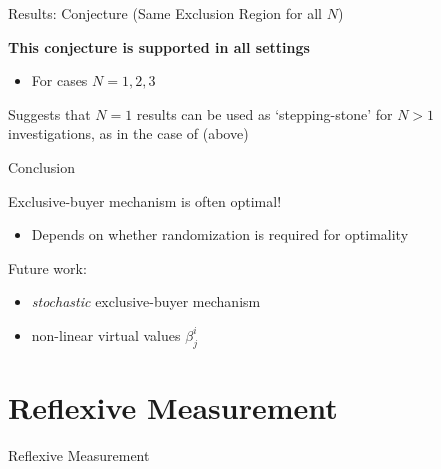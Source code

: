\documentclass[aspectratio=169,xcolor=dvipsnames]{beamer}
\begin{document}

\begin{frame}{Results: Conjecture (Same Exclusion Region for all $N$)}

\textbf{This conjecture is supported in all settings}
\begin{itemize}
    \item For cases $N=1,2,3$
\end{itemize}

\vspace{5mm}
Suggests that $N=1$ results can be used as `stepping-stone' for $N>1$ investigations, as in the case of \autocite{pavlov2011optimal} (above)

\end{frame}


\begin{frame}{Conclusion}

Exclusive-buyer mechanism is often optimal!
\begin{itemize}
    \item Depends on whether randomization is required for optimality
\end{itemize}

\vspace{5mm}
Future work:
\begin{itemize}
    \item \textit{stochastic} exclusive-buyer mechanism
    \item non-linear virtual values $\beta_j^i$
\end{itemize}

\end{frame}





\section{Reflexive Measurement}

\begin{frame}

    \vspace{10mm}
    {\Large{\centerline{Reflexive Measurement}}}

\end{frame}

\end{document}
